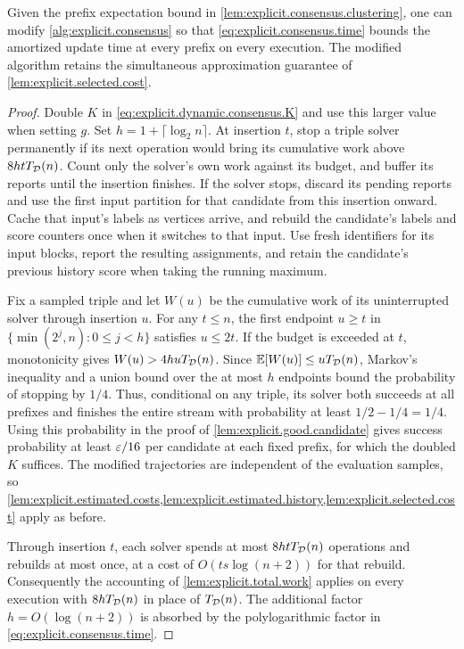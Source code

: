 \begin{lemma}\label{lem:explicit.capped.work}
Given the prefix expectation bound in \cref{lem:explicit.consensus.clustering}, one can modify \cref{alg:explicit.consensus} so that \eqref{eq:explicit.consensus.time} bounds the amortized update time at every prefix on every execution.
The modified algorithm retains the simultaneous approximation guarantee of \cref{lem:explicit.selected.cost}.
\end{lemma}
\begin{proof}
Double $ K $ in \eqref{eq:explicit.dynamic.consensus.K} and use this larger value when setting $ g $.
Set $ h=1+\lceil\log_2 n\rceil $.
At insertion $ t $, stop a triple solver permanently if its next operation would bring its cumulative work above $ 8htT_{\mathcal D}(n) $.
Count only the solver's own work against its budget, and buffer its reports until the insertion finishes.
If the solver stops, discard its pending reports and use the first input partition for that candidate from this insertion onward.
Cache that input's labels as vertices arrive, and rebuild the candidate's labels and score counters once when it switches to that input.
Use fresh identifiers for its input blocks, report the resulting assignments, and retain the candidate's previous history score when taking the running maximum.

Fix a sampled triple and let $ W(u) $ be the cumulative work of its uninterrupted solver through insertion $ u $.
For any $ t\le n $, the first endpoint $ u\ge t $ in $ \{\min(2^j,n):0\le j<h\} $ satisfies $ u\le2t $.
If the budget is exceeded at $ t $, monotonicity gives $ W(u)>4huT_{\mathcal D}(n) $.
Since $ \mathbb{E}[W(u)]\le uT_{\mathcal D}(n) $, Markov's inequality and a union bound over the at most $ h $ endpoints bound the probability of stopping by $ 1/4 $.
Thus, conditional on any triple, its solver both succeeds at all prefixes and finishes the entire stream with probability at least $ 1/2-1/4=1/4 $.
Using this probability in the proof of \cref{lem:explicit.good.candidate} gives success probability at least $ \varepsilon/16 $ per candidate at each fixed prefix, for which the doubled $ K $ suffices.
The modified trajectories are independent of the evaluation samples, so \cref{lem:explicit.estimated.costs,lem:explicit.estimated.history,lem:explicit.selected.cost} apply as before.

Through insertion $ t $, each solver spends at most $ 8htT_{\mathcal D}(n) $ operations and rebuilds at most once, at a cost of $ O(ts\log(n+2)) $ for that rebuild.
Consequently the accounting of \cref{lem:explicit.total.work} applies on every execution with $ 8hT_{\mathcal D}(n) $ in place of $ T_{\mathcal D}(n) $.
The additional factor $ h=O(\log(n+2)) $ is absorbed by the polylogarithmic factor in \eqref{eq:explicit.consensus.time}.
\end{proof}

